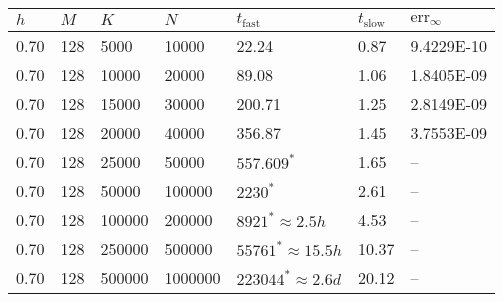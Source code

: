 \begin{tabular}{l|l|l|l|l|l|l}
$h$ & $M$ & $K$ & $N$ & $t_{\text{fast}}$ & $t_{\text{slow}}$ & $\text{err}_{\infty}$\\\hline
0.70 & 128 &   5000 &  10000 & 22.24 &  0.87 & 9.4229E-10\\
0.70 & 128 &  10000 &  20000 & 89.08 &  1.06 & 1.8405E-09\\
0.70 & 128 &  15000 &  30000 & 200.71 &  1.25 & 2.8149E-09\\
0.70 & 128 &  20000 &  40000 & 356.87 &  1.45 & 3.7553E-09\\
0.70 & 128 &  25000 &  50000 & $557.609^{*}$ &  1.65 & --\\
0.70 & 128 &  50000 & 100000 & $2230^{*}$ &  2.61 & --\\
0.70 & 128 & 100000 & 200000 & $8921^{*} \approx 2.5h$ &  4.53 & --\\
0.70 & 128 & 250000 & 500000 & $55761^{*} \approx 15.5h $ & 10.37 & --\\
0.70 & 128 & 500000 & 1000000 & $223044^{*} \approx 2.6d$ & 20.12 & --\\
\hline\end{tabular}
